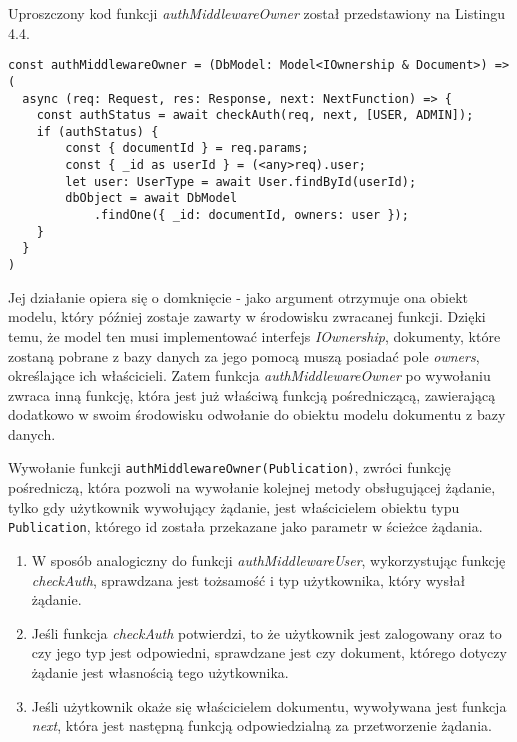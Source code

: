 \documentclass[a4paper,12pt,twoside,openany]{report}
\begin{document}
Uproszczony kod funkcji \textit{authMiddlewareOwner} został przedstawiony na Listingu 4.4.
\begin{lstlisting}[caption=Sygnatura funkcji authMiddlewareOwner,label=code1,captionpos=b]
const authMiddlewareOwner = (DbModel: Model<IOwnership & Document>) => (
  async (req: Request, res: Response, next: NextFunction) => {
	const authStatus = await checkAuth(req, next, [USER, ADMIN]);
	if (authStatus) {	
		const { documentId } = req.params;
		const { _id as userId } = (<any>req).user;
		let user: UserType = await User.findById(userId);
		dbObject = await DbModel
			.findOne({ _id: documentId, owners: user });
	}           
  }
)
\end{lstlisting}

Jej działanie opiera się o domknięcie - jako argument otrzymuje ona obiekt modelu, który później zostaje zawarty w środowisku zwracanej funkcji. Dzięki temu, że model ten musi implementować interfejs \textit{IOwnership}, dokumenty, które zostaną pobrane z bazy danych za jego pomocą muszą posiadać pole \textit{owners}, określające ich właścicieli.
Zatem funkcja  \textit{authMiddlewareOwner} po wywołaniu zwraca inną funkcję, która jest już właściwą funkcją pośredniczącą, zawierającą dodatkowo w swoim środowisku odwołanie do obiektu modelu dokumentu z bazy danych. 

Wywołanie funkcji \verb|authMiddlewareOwner(Publication)|, zwróci funkcję pośredniczą, która pozwoli na wywołanie kolejnej metody obsługującej żądanie, tylko gdy użytkownik wywołujący żądanie, jest właścicielem obiektu typu \verb|Publication|, którego id została przekazane jako parametr w ścieżce żądania.

\begin{enumerate}
	
	\item W sposób analogiczny do funkcji \textit{authMiddlewareUser}, wykorzystując funkcję \textit{checkAuth}, sprawdzana jest tożsamość i typ użytkownika, który wysłał żądanie.
	
	\item Jeśli funkcja \textit{checkAuth} potwierdzi, to że użytkownik jest zalogowany oraz to czy jego typ jest odpowiedni, sprawdzane jest czy dokument, którego dotyczy żądanie jest własnością tego użytkownika. 
	
	\item Jeśli użytkownik okaże się właścicielem dokumentu, wywoływana jest funkcja \textit{next}, która jest następną funkcją odpowiedzialną za przetworzenie żądania.
\end{enumerate}
\end{document}
